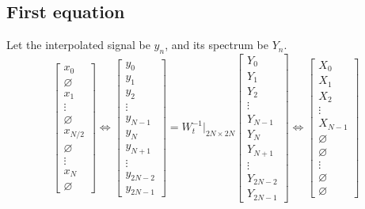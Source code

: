 \documentclass[12pt]{article}
\begin{document}
\subsection{First equation}
Let the interpolated signal be $y_n$, and its spectrum be $Y_n$.
\begin{equation}
    \begin{bmatrix}
        x_0 \\ \varnothing \\ x_1 \\ \vdots \\ \varnothing \\ x_{N/2} \\ \varnothing \\ \vdots \\ x_N \\ \varnothing
    \end{bmatrix}
\Leftrightarrow
    \begin{bmatrix}
        y_0 \\ y_1 \\ y_2 \\ \vdots \\ y_{N-1} \\ y_N \\ y_{N+1} \\ \vdots \\ y_{2N-2} \\ y_{2N-1}
    \end{bmatrix}
= W_t^{-1}|_{2N\times 2N}
    \begin{bmatrix}
        Y_0 \\ Y_1 \\ Y_2 \\ \vdots \\ Y_{N-1} \\Y_N \\ Y_{N+1} \\ \vdots \\ Y_{2N-2} \\ Y_{2N-1} 
    \end{bmatrix}
\Leftrightarrow
    \begin{bmatrix}
        X_0 \\ X_1  \\ X_2 \\ \vdots \\ X_{N-1} \\ \varnothing \\ \varnothing \\ \vdots \\ \varnothing \\ \varnothing
    \end{bmatrix}
\end{equation}
\end{document}

